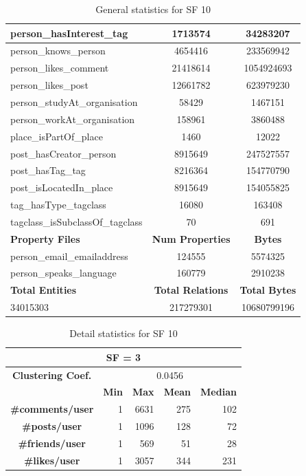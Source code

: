 \begin{table}[H]
\begin{tabular} {| l | c | c |}
        \hline
        person\_hasInterest\_tag & 1713574 & 34283207 \\
        \hline
        person\_knows\_person & 4654416 & 233569942 \\
        \hline
        person\_likes\_comment & 21418614 & 1054924693 \\
        \hline
        person\_likes\_post & 12661782 & 623979230 \\
        \hline
        person\_studyAt\_organisation & 58429 & 1467151 \\
        \hline
        person\_workAt\_organisation & 158961 & 3860488 \\
        \hline
        place\_isPartOf\_place & 1460 & 12022 \\
        \hline
        post\_hasCreator\_person & 8915649 & 247527557 \\
        \hline
        post\_hasTag\_tag & 8216364 & 154770790 \\
        \hline
        post\_isLocatedIn\_place & 8915649 & 154055825 \\
        \hline
        tag\_hasType\_tagclass & 16080 & 163408 \\
        \hline
        tagclass\_isSubclassOf\_tagclass & 70 & 691 \\
        \hline
        \hline
        \textbf{Property Files} & \textbf{Num Properties} & \textbf{Bytes} \\
        \hline
        \hline
        person\_email\_emailaddress & 124555 & 5574325 \\
        \hline
        person\_speaks\_language & 160779 & 2910238 \\
        \hline
        \hline
        \textbf{Total Entities} & \textbf{Total Relations} & \textbf{Total Bytes} \\
        \hline
        \hline
         34015303 & 217279301 & 10680799196 \\
        \hline
    \end{tabular}
    \caption{General statistics for SF 10}
\end{table}

\begin{table}[H]
\centering
\begin{tabular}{|c||r|r|r|r|}
\hline    \multicolumn{5}{|c|}{SF = 3 }  \\
\hline   \textbf{Clustering Coef.} &   \multicolumn{4}{|c|}{0.0456} \\
\hline & \textbf{Min} & \textbf{Max} & \textbf{Mean} & \textbf{Median}   \\
\hline  \textbf{\#comments/user}  &1 &  6631 & 275 & 102 \\
\hline  \textbf{\#posts/user}  &1 &  1096 & 128 & 72 \\
\hline  \textbf{\#friends/user}  &1 &  569 & 51 & 28 \\
\hline  \textbf{\#likes/user}  &1 &  3057 & 344 & 231 \\
\hline
\end{tabular}
\caption{Detail statistics for SF 10}
\end{table}

